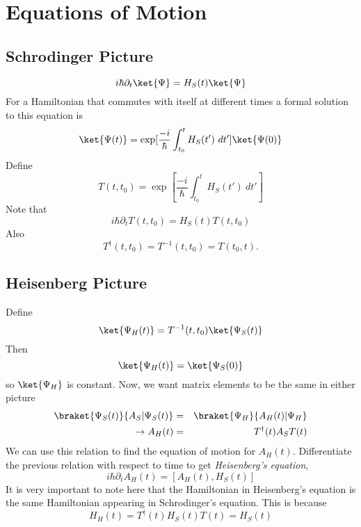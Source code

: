 \section{Equations of Motion}

\subsection{Schrodinger Picture}

\begin{equation}
i\hbar\partial_{t}\ket{\Psi}=H_{S}(t)\ket{\Psi} \end{equation}
For a Hamiltonian that commutes with itself at different times a
formal solution to this equation is \begin{equation}
\ket{\Psi(t)}=\exp[\frac{-i}{\hbar}\int_{t_{0}}^{t}H_{S}(t')~dt']\ket{\Psi(0)} \end{equation}
Define \begin{equation}
T(t,t_{0})=\exp[\frac{-i}{\hbar}\int_{t_{0}}^{t}H_{S}(t')~dt'] \end{equation}
Note that \begin{equation}
i\hbar\partial_{t}T(t,t_{0})=H_{S}(t)T(t,t_{0}) \end{equation}
Also \begin{equation}
T^{\dagger}(t,t_{0})=T^{-1}(t,t_{0})=T(t_{0},t). \end{equation}

\subsection{Heisenberg Picture}

Define \begin{equation}
\ket{\Psi_{H}(t)}=T^{-1}(t,t_{0})\ket{\Psi_{S}(t)} \end{equation}
Then \begin{equation}
\ket{\Psi_{H}(t)}=\ket{\Psi_{S}(0)} \end{equation}
so $\ket{\Psi_{H}}$ is constant. Now, we want matrix elements to be the same in either picture \begin{eqnarray*}
\braket{\Psi_{S}(t)}{A_{S}|\Psi_{S}(t)} & = & \braket{\Psi_{H}}{A_{H}(t)|\Psi_{H}}\\
\rightarrow A_{H}(t) & = & T^{\dagger}(t)A_{S}T(t)\end{eqnarray*}
We can use this relation to find the equation of motion for $A_{H}(t)$. Differentiate the previous relation with respect to time to get \emph{Heisenberg's equation}, \begin{equation}
i\hbar\partial_{t}A_{H}(t)=[A_{H}(t),H_{S}(t)] \end{equation}
It is very important to note here that the Hamiltonian in Heisenberg's equation is the same Hamiltonian appearing in Schrodinger's equation. This is because \begin{equation}
H_{H}(t)=T^{\dagger}(t)H_{S}(t)T(t)=H_{S}(t) \end{equation}

